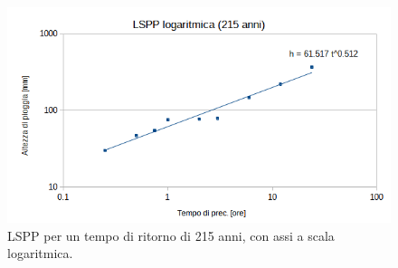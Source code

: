 \begin{figure}[H]\centering
    \includegraphics[scale=0.75]{immagini/LSPP_log_215.png}
    \caption{LSPP per un tempo di ritorno di 215 anni, con assi a scala logaritmica.}
\end{figure}

